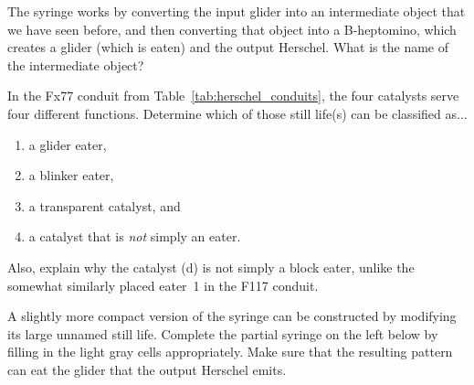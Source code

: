 \begin{multicols}{2}
	
	\begin{problemstar}\label{exer:syringe_creates_pi} 
		The syringe works by converting the input glider into an intermediate object that we have seen before, and then converting that object into a B-heptomino, which creates a glider (which is eaten) and the output Herschel. What is the name of the intermediate object?
	\end{problemstar}


	\mfilbreak
	
	
	\begin{problem}\label{exer:stable_catalysists_Fx77} 
		In the Fx77 conduit from Table~\ref{tab:herschel_conduits}, the four catalysts serve four different functions. Determine which of those still life(s) can be classified as...\smallskip
		
		\begin{enumerate}[label=\bf\color{ocre}(\alph*)]
			\item a glider eater,
			
			\item a blinker eater,
			
			\item a transparent catalyst, and
			
			\item a catalyst that is \emph{not} simply an eater.\smallskip
		\end{enumerate}
	
		\noindent Also, explain why the catalyst (d) is not simply a block eater, unlike the somewhat similarly placed eater~1 in the F117 conduit.
	\end{problem}
	
	
	\mfilbreak
	
	\begin{problemstar}\label{exer:syringe_compact} 
		A slightly more compact version of the syringe can be constructed by modifying its large unnamed still life. Complete the partial syringe on the left below by filling in the light gray cells appropriately. Make sure that the resulting pattern can eat the glider that the output Herschel emits.\\[-0.75cm]
		
		\begin{center}
			~\quad~
		\end{center}
		

\end{problemstar}
\end{multicols}
